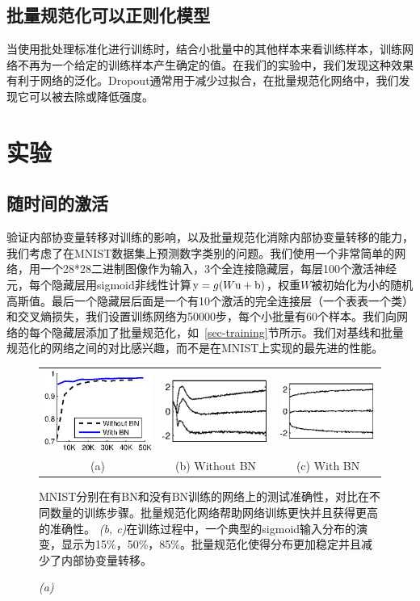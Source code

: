 \documentclass[twocolumn]{article}
\begin{document}
\subsection{批量规范化可以正则化模型} 
\label{sec-regularizer}
当使用批处理标准化进行训练时，结合小批量中的其他样本来看训练样本，训练网络不再为一个给定的训练样本产生确定的值。在我们的实验中，我们发现这种效果有利于网络的泛化。Dropout通常用于减少过拟合，在批量规范化网络中，我们发现它可以被去除或降低强度。

\section{实验}



\subsection{随时间的激活}

验证内部协变量转移对训练的影响，以及批量规范化消除内部协变量转移的能力，我们考虑了在MNIST数据集\cite{mnist}上预测数字类别的问题。我们使用一个非常简单的网络，用一个28*28二进制图像作为输入，3个全连接隐藏层，每层100个激活神经元，每个隐藏层用sigmoid非线性计算$\mathrm{y} = g(W\mathrm{u}+\mathrm{b})$，权重$W$被初始化为小的随机高斯值。最后一个隐藏层后面是一个有10个激活的完全连接层（一个表表一个类）和交叉熵损失，我们设置训练网络为50000步，每个小批量有60个样本。我们向网络的每个隐藏层添加了批量规范化，如~\ref{sec-training}节所示。我们对基线和批量规范化的网络之间的对比感兴趣，而不是在MNIST上实现的最先进的性能。

\begin{figure}
\centering
\begin{tabular}{@{}c@{\,}c@{}c@{}}
\includegraphics[width=0.28\columnwidth]{mnist.eps}
&
\includegraphics[width=0.35\columnwidth]{evo.eps}&
\includegraphics[width=0.35\columnwidth]{evo-bn.eps}\\
(a)&(b) Without BN&(c) With BN
\end{tabular} 
\caption{\em(a)} 
MNIST分别在有BN和没有BN训练的网络上的测试准确性，对比在不同数量的训练步骤。批量规范化网络帮助网络训练更快并且获得更高的准确性。
{\em(b, c)}在训练过程中，一个典型的sigmoid输入分布的演变，显示为{15\%，50\%，85\%}。批量规范化使得分布更加稳定并且减少了内部协变量转移。
\label{fig-mnist}
\end{figure}
\end{document}
